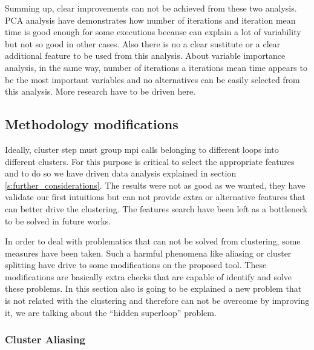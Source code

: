 % 

Summing up, clear improvements can not be achieved from these two analysis. PCA
analysis have demonstrates how
number of iterations and iteration mean time is good enough for some executions
because can explain a lot of variability but not so good in other cases. Also
there is no a clear sustitute or a clear additional feature to be used
from this analysis. About variable importance analysis, in the same way, number
of iterations a iterations mean time appears to be the most important variables
and no alternatives can be easily selected from this analysis. More research
have to be driven here.

\subsection{Methodology modifications}\label{ss:methodology_modifications}

Ideally, cluster step must group mpi calls belonging to different loops into
different clusters. For this purpose is critical to select the appropriate
features and to do so we have driven data analysis explained in section
\ref{s:further_considerations}. The results were not as good as we wanted,
they have validate our first intuitions but can not provide extra or alternative
features that can better drive the clustering. The features search have been 
left as a bottleneck to be solved in future works. 

In order to
deal with problematics that can not be solved from clustering, some measures
have been taken. Such a harmful phenomena like aliasing or cluster splitting 
have drive to some modifications on the proposed tool. These modifications are 
basically extra checks that are capable of identify and solve these problems.
In this section also is going to be explained a new 
problem that is not related with the clustering and therefore can not be 
overcome by improving it, we are talking about the ``hidden superloop'' problem.

\subsubsection{Cluster Aliasing}\label{ss:cluster_aliasing}


